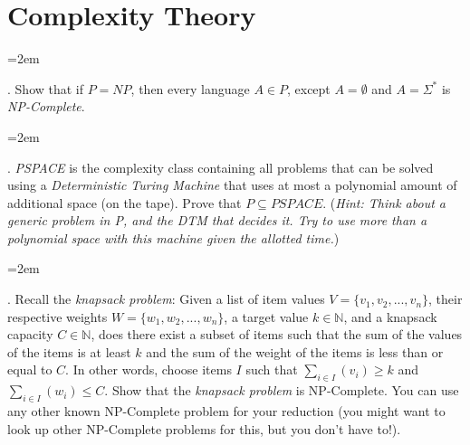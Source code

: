 \documentclass[12pt]{article}
\def\homework{Complexity Theory}
\newcounter{quesnum}
\newcommand{\question}[2][??]{
\begin{list}{\labelitemi}{\leftmargin=2em}
\item [\arabic{quesnum}.] {} {#2}
\end{list}
\addtocounter{quesnum}{1}
}
\begin{document}
\section*{\homework}



\question[3]{
Show that if $P = NP$, then every language $A \in P$, except $A = \emptyset$ and $A = \Sigma^*$ is \emph{NP-Complete}.
}

\vspace{12pt}



\question[3]{
\emph{PSPACE} is the complexity class containing all problems that can be solved using a \emph{Deterministic Turing Machine} that uses at most a polynomial amount of additional space (on the tape). Prove that $P \subseteq \textit{PSPACE}$. (\emph{Hint: Think about a generic problem in P, and the DTM that decides it. Try to use more than a polynomial space with this machine given the allotted time.})
}


\vspace{12pt}

\question[3]{
Recall the \emph{knapsack problem}: Given a list of item values $V = \{v_1,v_2,...,v_n\}$, their respective weights $W = \{w_1,w_2,...,w_n\}$, a target value $k \in \mathbb{N}$, and a knapsack capacity $C \in \mathbb{N}$, does there exist a subset of items such that the sum of the values of the items is at least $k$ and the sum of the weight of the items is less than or equal to $C$. In other words, choose items $I$ such that $\sum_{i \in I}(v_i) \geq k$ and $\sum_{i \in I}(w_i) \leq C$. Show that the \emph{knapsack problem} is NP-Complete. You can use any other known NP-Complete problem for your reduction (you might want to look up other NP-Complete problems for this, but you don't have to!).
}

\vspace{12pt}
\end{document}
